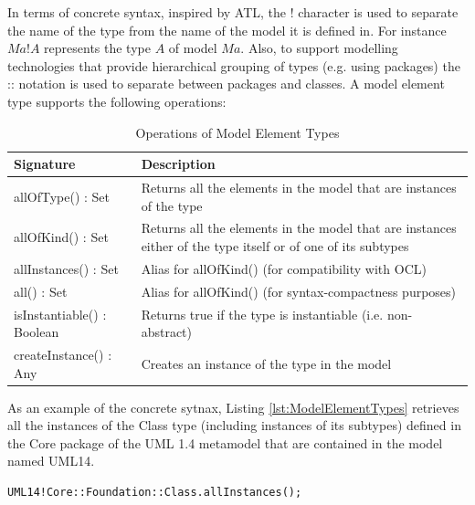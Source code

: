 In terms of concrete syntax, inspired by ATL, the ! character is used to separate the name of the type from the name of the model it is defined in. For instance $Ma!A$ represents the type $A$ of model $Ma$. Also, to support modelling technologies that provide hierarchical grouping of types (e.g. using packages) the :: notation is used to separate between packages and classes.  A model element type supports the following operations:

\begin{longtable} {|p{5.5cm}|p{6.5cm}|}
			
			\caption{Operations of Model Element Types}
			\label{tab:ModelElementTypesOperations}\\
			
			\hline
			
			\textbf{Signature} & \textbf{Description} \\\hline
			
			allOfType() : Set & Returns all the elements in the model that are instances of the type \\\hline
			
			allOfKind() : Set & Returns all the elements in the model that are instances either of the type itself or of one of its subtypes  \\\hline

			allInstances() : Set & Alias for allOfKind() (for compatibility with OCL) \\\hline
						
			all() : Set & Alias for allOfKind() (for syntax-compactness purposes) \\\hline
			
			isInstantiable() : Boolean & Returns true if the type is instantiable (i.e. non-abstract)  \\\hline
			
			createInstance() : Any & Creates an instance of the type in the model \\\hline
			
\end{longtable}

As an example of the concrete sytnax, Listing \ref{lst:ModelElementTypes} retrieves all the instances of the Class type (including instances of its subtypes) defined in the Core package of the UML 1.4 metamodel that are contained in the model named UML14.

\begin{lstlisting}[basicstyle=\ttfamily\footnotesize, flexiblecolumns=true, numbers=none, nolol=true, caption=Demonstration of the concrete syntax for accessing model element types, label=lst:ModelElementTypes, numbers=left, language=EOL, tabsize=2]
UML14!Core::Foundation::Class.allInstances();
\end{lstlisting}

